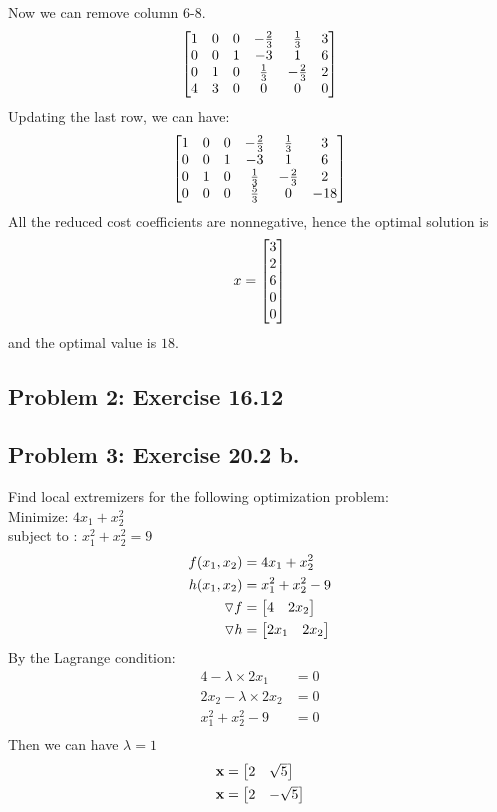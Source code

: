 \documentclass{article}
\begin{document}
Now we can remove column 6-8. 
\begin{align*}
\begin{bmatrix} 1& 0 & 0 & -\frac{2}{3} & \frac{1}{3} & 3 \\
0 & 0 & 1 & -3 & 1 & 6 \\
0 & 1 & 0 & \frac{1}{3} & -\frac{2}{3} & 2 \\
4 & 3 & 0 & 0 & 0 & 0 \\ \end{bmatrix}
\end{align*} 
Updating the last row, we can have: \\
\begin{align*} 
\begin{bmatrix} 1& 0 & 0 & -\frac{2}{3} & \frac{1}{3} & 3 \\
0 & 0 & 1 & -3 & 1 & 6 \\
0 & 1 & 0 & \frac{1}{3} & -\frac{2}{3} & 2 \\
0 & 0 & 0 & \frac{5}{3} & 0 & -18 \\ \end{bmatrix}
\end{align*}
All the reduced cost coefficients are nonnegative, hence the optimal solution is \begin{align*} 
x = \begin{bmatrix} 3 \\ 2\\ 6\\ 0\\ 0 \end{bmatrix}  \end{align*} 
and the optimal value is $18$. 

\hypertarget{}{}
\subsection*{{Problem 2: Exercise 16.12}}
\label{}

\hypertarget{}{}
\subsection*{{Problem 3: Exercise 20.2 b. }}
\label{}
 Find  local extremizers for the following optimization problem: \\
 Minimize:  $ 4x_1 + x_2^2 $   \\
 subject to :  $ x_1^2 + x_2^2  = 9 $\\
 
\begin{align*} 
f(x_1,x_2)  & = 4x_1 + x_2^2 \\
h(x_1, x_2) & = x_1^2 + x_2^2 - 9 \\ 
\triangledown f  & = \begin{bmatrix}  4 &  2x_2 \end{bmatrix}  \\
\triangledown h & = \begin{bmatrix} 2x_1 & 2x_2  \end{bmatrix} \\
\end{align*} 
By the Lagrange condition:  \begin{align*} 
4-\lambda\times 2 x_1 & = 0 \\
2x_2 -\lambda\times 2 x_2 & = 0 \\
x_1^2 + x_2^2 - 9 & = 0 \\ 
\end{align*} 
Then we can have $\lambda = 1 $ \\
\begin{align*} 
\boldsymbol{\mathrm{x}} &= \begin{bmatrix} 2 & \sqrt{5}  \end{bmatrix} \\
\boldsymbol{\mathrm{x}} &= \begin{bmatrix} 2 & -\sqrt{5}  \end{bmatrix} 
\end{align*} 
\end{document}
